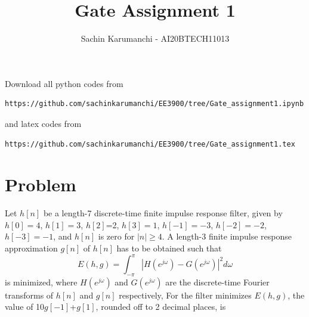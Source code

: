 \documentclass[journal,12pt,twocolumn]{IEEEtran}
\begin{document}
\let\StandardTheFigure\thefigure
\let\vec\mathbf
\renewcommand{\thefigure}{\theproblem}
\def\putbox#1#2#3{\makebox[0in][l]{\makebox[#1][l]{}\raisebox{\baselineskip}[0in][0in]{\raisebox{#2}[0in][0in]{#3}}}}
     \def\rightbox#1{\makebox[0in][r]{#1}}
     \def\centbox#1{\makebox[0in]{#1}}
     \def\topbox#1{\raisebox{-\baselineskip}[0in][0in]{#1}}
     \def\midbox#1{\raisebox{-0.5\baselineskip}[0in][0in]{#1}}
\vspace{3cm}
\title{Gate Assignment 1}
\author{Sachin Karumanchi - AI20BTECH11013}
\maketitle
\newpage
\bigskip
\renewcommand{\thefigure}{\theenumi}
\renewcommand{\thetable}{\theenumi}
Download all python codes from
\begin{lstlisting}
https://github.com/sachinkarumanchi/EE3900/tree/Gate_assignment1.ipynb
\end{lstlisting}
and latex codes from
\begin{lstlisting}
https://github.com/sachinkarumanchi/EE3900/tree/Gate_assignment1.tex
\end{lstlisting}
\section*{Problem}
Let $h[n]$ be a length-7 discrete-time finite impulse response filter, given by $h[0]=4$, $h[1]=3$, $h[2]$=2, $h[3]=1$, $h[-1]=-3$, $h[-2]=-2$, $h[-3]=-1$, and $h[n]$ is zero for $|n|\geq 4$. A length-3 finite impulse response approximation $g[n]$ of $h[n]$ has to be obtained such that
$$E(h,g)=\int_{-\pi}^{\pi}\left|H(e^{j\omega})-G(e^{j\omega})\right|^2d\omega$$
is minimized, where $H(e^{j\omega})$ and $G(e^{j\omega})$ are the discrete-time Fourier transforms of $h[n]$ and $g[n]$ respectively, For the filter minimizes $E(h,g)$, the value of 10$g[-1]$+$g[1]$, rounded off to 2 decimal places, is
\end{document}
